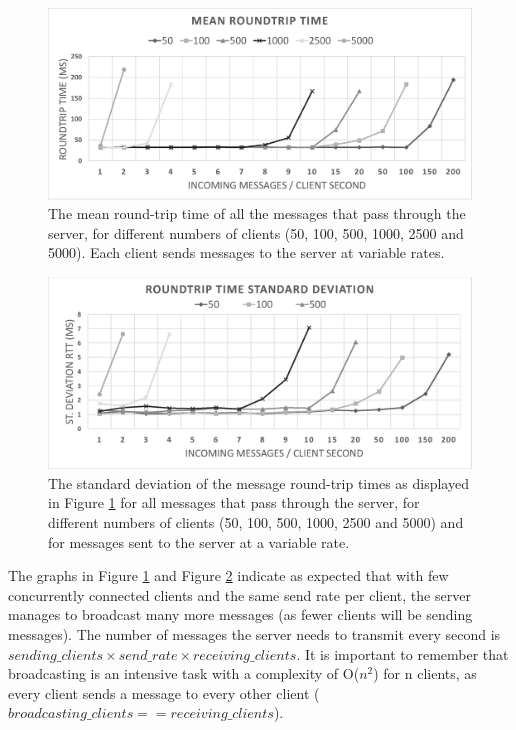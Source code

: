 \documentclass[bsc, 12pt, twoside, singlespacing, parskip, abbrevs, notimes, normalheadings, logo, deptreport]{styles/infthesis}
\begin{document}
\begin{figure}[H]
\centering
\includegraphics[scale=0.58]{images/test_SERVER_RTTmean.eps}
\caption{The mean round-trip time of all the messages that pass through the server, for different numbers of clients (50, 100, 500, 1000, 2500 and 5000). Each client sends messages to the server at variable rates.}
\label{fig:broadcast_rtt_mean}
\end{figure}

\begin{figure}[H]
\centering
\includegraphics[scale=0.58]{images/test_SERVER_RTTstd.eps}
\caption{The standard deviation of the message round-trip times as displayed in Figure \ref{fig:broadcast_rtt_mean} for all messages that pass through the server, for different numbers of clients (50, 100, 500, 1000, 2500 and 5000) and for messages sent to the server at a variable rate.}
\label{fig:broadcast_rtt_std}
\end{figure}

The graphs in Figure \ref{fig:broadcast_rtt_mean} and Figure \ref{fig:broadcast_rtt_std} indicate as expected that with few concurrently connected clients and the same send rate per client, the server manages to broadcast many more messages (as fewer clients will be sending messages). The number of messages the server needs to transmit every second is $sending\_clients \times send\_rate \times receiving\_clients$. It is important to remember that broadcasting is an intensive task with a complexity of O($n^{2}$) for n clients, as every client sends a message to every other client ($broadcasting\_clients == receiving\_clients$). 
\end{document}
